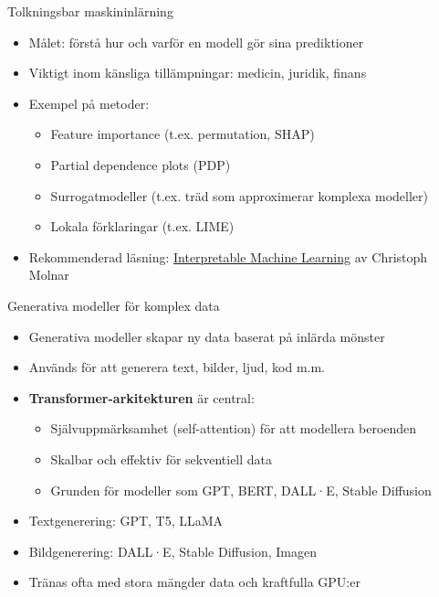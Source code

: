 \documentclass[10pt,english]{beamer}
\begin{document}
\begin{frame}{Tolkningsbar maskininlärning}
  \begin{itemize}
    \item Målet: förstå hur och varför en modell gör sina prediktioner
    \item Viktigt inom känsliga tillämpningar: medicin, juridik, finans
    \item Exempel på metoder:
    \begin{itemize}
      \item Feature importance (t.ex. permutation, SHAP)
      \item Partial dependence plots (PDP)
      \item Surrogatmodeller (t.ex. träd som approximerar komplexa modeller)
      \item Lokala förklaringar (t.ex. LIME)
    \end{itemize}
    \item Rekommenderad läsning: \href{https://christophm.github.io/interpretable-ml-book/}{Interpretable Machine Learning}  av Christoph Molnar
  \end{itemize}
\end{frame}

\begin{frame}{Generativa modeller för komplex data}
  \begin{itemize}
    \item Generativa modeller skapar ny data baserat på inlärda mönster
    \item Används för att generera text, bilder, ljud, kod m.m.
    \item \textbf{Transformer-arkitekturen} är central:
    \begin{itemize}
      \item Självuppmärksamhet (self-attention) för att modellera beroenden
      \item Skalbar och effektiv för sekventiell data
      \item Grunden för modeller som GPT, BERT, DALL·E, Stable Diffusion
    \end{itemize}
    \item Textgenerering: GPT, T5, LLaMA
    \item Bildgenerering: DALL·E, Stable Diffusion, Imagen
    \item Tränas ofta med stora mängder data och kraftfulla GPU:er
  \end{itemize}
\end{frame}
\end{document}
